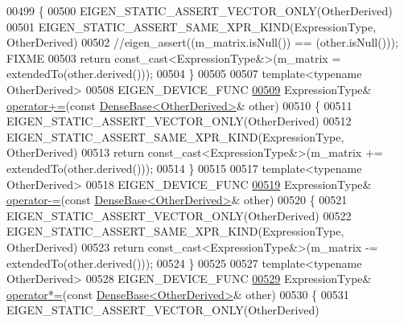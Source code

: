 \begin{DoxyCode}
00499     \{
00500       EIGEN\_STATIC\_ASSERT\_VECTOR\_ONLY(OtherDerived)
00501       EIGEN\_STATIC\_ASSERT\_SAME\_XPR\_KIND(ExpressionType, OtherDerived)
00502       \textcolor{comment}{//eigen\_assert((m\_matrix.isNull()) == (other.isNull())); FIXME}
00503       \textcolor{keywordflow}{return} \textcolor{keyword}{const\_cast<}ExpressionType&\textcolor{keyword}{>}(m\_matrix = extendedTo(other.derived()));
00504     \}
00505 
00507     \textcolor{keyword}{template}<\textcolor{keyword}{typename} OtherDerived>
00508     EIGEN\_DEVICE\_FUNC
\hyperlink{group___core___module_ad60d01ea6717f9ef6fd7941cf8b99db7}{00509}     ExpressionType& \hyperlink{group___core___module_ad60d01ea6717f9ef6fd7941cf8b99db7}{operator+=}(\textcolor{keyword}{const} \hyperlink{group___core___module_class_eigen_1_1_dense_base}{DenseBase<OtherDerived>}& other)
00510     \{
00511       EIGEN\_STATIC\_ASSERT\_VECTOR\_ONLY(OtherDerived)
00512       EIGEN\_STATIC\_ASSERT\_SAME\_XPR\_KIND(ExpressionType, OtherDerived)
00513       \textcolor{keywordflow}{return} \textcolor{keyword}{const\_cast<}ExpressionType&\textcolor{keyword}{>}(m\_matrix += extendedTo(other.derived()));
00514     \}
00515 
00517     \textcolor{keyword}{template}<\textcolor{keyword}{typename} OtherDerived>
00518     EIGEN\_DEVICE\_FUNC
\hyperlink{group___core___module_acf1e97639651a9b617680ba3b3ece24a}{00519}     ExpressionType& \hyperlink{group___core___module_acf1e97639651a9b617680ba3b3ece24a}{operator-=}(\textcolor{keyword}{const} \hyperlink{group___core___module_class_eigen_1_1_dense_base}{DenseBase<OtherDerived>}& other)
00520     \{
00521       EIGEN\_STATIC\_ASSERT\_VECTOR\_ONLY(OtherDerived)
00522       EIGEN\_STATIC\_ASSERT\_SAME\_XPR\_KIND(ExpressionType, OtherDerived)
00523       \textcolor{keywordflow}{return} \textcolor{keyword}{const\_cast<}ExpressionType&\textcolor{keyword}{>}(m\_matrix -= extendedTo(other.derived()));
00524     \}
00525 
00527     \textcolor{keyword}{template}<\textcolor{keyword}{typename} OtherDerived>
00528     EIGEN\_DEVICE\_FUNC
\hyperlink{group___core___module_ad5e0f0005806295e07c11534f698351e}{00529}     ExpressionType& \hyperlink{group___core___module_ad5e0f0005806295e07c11534f698351e}{operator*=}(\textcolor{keyword}{const} \hyperlink{group___core___module_class_eigen_1_1_dense_base}{DenseBase<OtherDerived>}& other)
00530     \{
00531       EIGEN\_STATIC\_ASSERT\_VECTOR\_ONLY(OtherDerived)

\end{DoxyCode}
